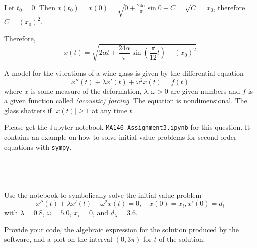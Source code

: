 \documentclass[a4paper]{article}
\begin{document}
Let $t_0 = 0$. Then $x(t_0) = x(0) = \sqrt{0 + \frac{24 \alpha}{\pi} \sin 0 + C} = \sqrt{C} = x_0$, therefore $C = (x_0)^2$.

Therefore, $$x(t) = \sqrt{2\alpha t + \frac{24\alpha}{\pi} \sin \left(\frac{\pi}{12} t\right) + (x_0)^2}$$


\begin{questionbody}
A model for the vibrations of a wine glass is given by the differential equation \begin{equation}\label{eqn:Q3-vibrations-ode}
x''(t) + \lambda x'(t) + \omega^2 x(t) = f(t)
\end{equation}
where $x$ is some measure of the deformation, $\lambda, \omega > 0$ are given numbers and $f$ is a given function called \textit{(acoustic) forcing}. The equation is nondimensional. The glass shatters if $|x(t)| \ge 1$ at any time $t$.

Please get the Jupyter notebook \texttt{MA146\_Assignment3.ipynb} for this question. It contains an example on how to solve initial value problems for second order equations with \texttt{sympy}.
\end{questionbody}

\subsection{~} %

\begin{questionbody}
Use the notebook to symbolically solve the initial value problem \[
x''(t) + \lambda x'(t) + \omega^2 x(t) = 0, \quad x(0) = x_i, x'(0) = d_i
\] with $\lambda = 0.8$, $\omega = 5.0$, $x_i = 0$, and $d_λ = 3.6$.

Provide your code, the algebraic expression for the solution produced by the software, and a plot on the interval $(0, 3\pi)$ for $t$ of the solution.
\end{questionbody}
\end{document}
